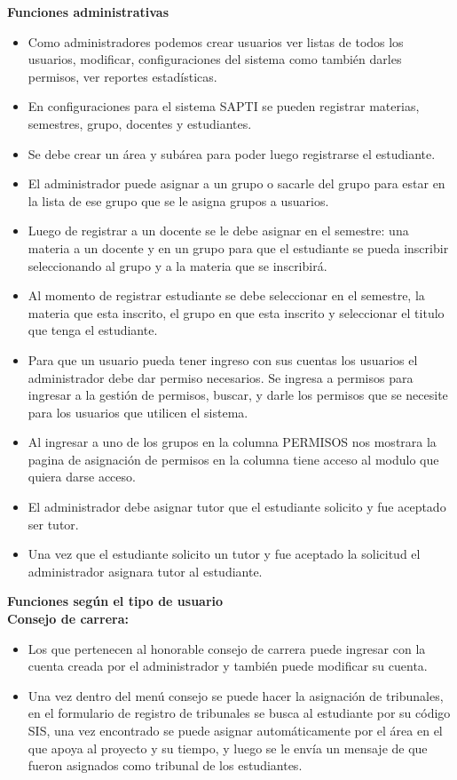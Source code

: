 \documentclass[10pt,letterpaper,twoside]{article}
\newcommand{\btext}[1]{
    \vspace{10mm}
    {{\textcolor{titlecolor}{\large{\textbf{\textsf{#1}}}}}}
    \vspace{5mm}
    \\
}
\newcommand{\ctext}[1]{
    \vspace{5mm}
    {{\textcolor{titlecolor}{\large{\textbf{\textsf{#1}}}}}}
    \\
}
\begin{document}
\begin{multicols}{2}
\btext{Funciones administrativas}
\begin{itemize}
    \item Como administradores podemos crear usuarios ver listas de todos los usuarios, modificar, configuraciones del sistema como también darles permisos, ver reportes estadísticas.
    \item En configuraciones para el sistema SAPTI se pueden registrar materias, semestres, grupo, docentes y estudiantes.
    \item Se debe crear un área y subárea para poder luego registrarse el estudiante.
    \item El administrador puede asignar a un grupo o sacarle del grupo para estar en la lista de ese grupo que se le asigna grupos a usuarios.
    \item Luego de registrar a un docente se le debe asignar en el semestre: una materia a un docente y en un grupo para que el estudiante se pueda inscribir seleccionando al grupo y a la materia que se inscribirá.
    \item Al momento de registrar estudiante se debe seleccionar en el semestre, la materia que esta inscrito, el grupo en que esta inscrito y seleccionar el titulo que tenga el estudiante.
    \item Para que un usuario pueda tener ingreso con sus cuentas los usuarios el administrador debe dar permiso necesarios. Se ingresa a permisos para ingresar a la gestión de permisos, buscar, y darle los permisos que se necesite para los usuarios que utilicen el sistema.
    \item Al ingresar a uno de los grupos en la columna PERMISOS nos mostrara la pagina de asignación de permisos en la columna tiene acceso al modulo que quiera darse acceso.
    \item El administrador debe asignar tutor que el estudiante solicito y fue aceptado ser tutor.
    \item Una vez que el estudiante solicito un tutor y fue aceptado la solicitud el administrador asignara tutor al estudiante.
\end{itemize}

\btext{Funciones según el tipo de usuario}

\ctext{Consejo de carrera:}
\begin{itemize}
    \item Los que pertenecen al honorable consejo de carrera puede ingresar con la cuenta creada por el administrador y también puede modificar su cuenta.
    \item Una vez dentro del menú consejo se puede hacer la asignación de tribunales, en el formulario de registro de tribunales se busca al estudiante por su código SIS, una vez encontrado se puede asignar automáticamente por el área en el que apoya al proyecto y su tiempo, y luego se le envía un mensaje de que fueron asignados como tribunal de los estudiantes.
\end{itemize}


\end{multicols}
\end{document}
